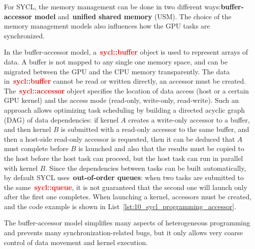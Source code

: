 \par
For SYCL, the memory management can be done in two different ways:\textbf{buffer-accessor model} and~\textbf{unified shared memory} (USM).
The choice of the memory management models also influences how the GPU tasks are synchronized.


\par
In the buffer-accessor model, a~\textbf{\textcolor{red}{sycl::buffer}} object is used to represent arrays of data. A buffer is not mapped to any single one memory space, and can be migrated between the GPU and the CPU memory transparently.
The data in~\textbf{\textcolor{red}{sycl::buffer}} cannot be read or written directly, an accessor must be created.
The~\textbf{\textcolor{red}{sycl::accessor}} object specifies the location of data access (host or a certain GPU kernel) and the access mode (read-only, write-only, read-write).
Such an approach allows optimizing task scheduling by building a directed acyclic graph (DAG) of data dependencies: if kernel $A$ creates a write-only accessor to a buffer, and then kernel $B$ is submitted with a read-only accessor to the same buffer, and then a host-side read-only accessor is requested, then it can be deduced that $A$ must complete before $B$ is launched and also that the results must be copied to the host before the host task can proceed, but the host task can run in parallel with kernel $B$.
Since the dependencies between tasks can be built automatically, by default SYCL uses~\textbf{out-of-order queues}: when two tasks are submitted to the same~\textbf{\textcolor{red}{sycl::queue}}, it is not guaranteed that the second one will launch only after the first one completes.
When launching a kernel, accessors must be created, and the code example is shown in List~\ref{lst:10_sycl_programming_accessor}.





\par
The buffer-accessor model simplifies many aspects of heterogeneous programming and prevents many synchronization-related bugs, but it only allows very coarse control of data movement and kernel execution.


